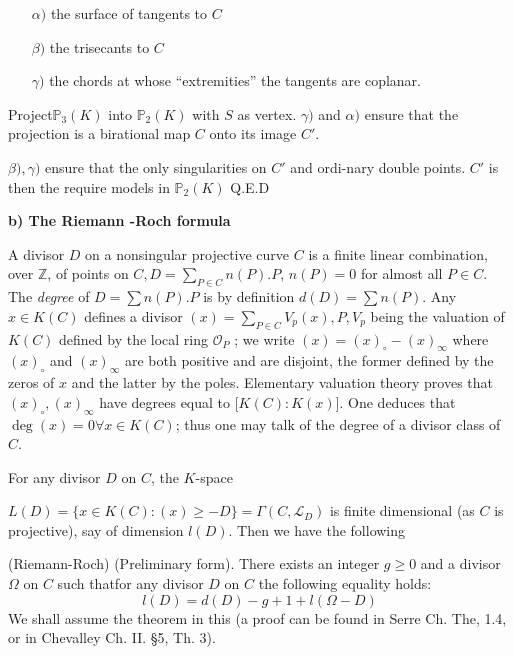 \begin{enumerate} 
\item [$\alpha)$] the surface of tangents to $C$
  
\item [$\beta)$] the trisecants to $C$
  
\item[$\gamma)$] the chords at whose ``extremities'' the tangents are
  coplanar. 
\end{enumerate}
 
Project\pageoriginale $\mathbb{P}_3(K)$ into   $\mathbb{P}_2(K)$ with $S$ as
vertex. $\gamma)$ and $\alpha)$ ensure that the projection is a
birational  map  $C$ onto its image $C'$. 

$\beta), \gamma)$ ensure that the
only singularities on $C'$ and ordi-nary double points. $C'$ is then
the require models in $\mathbb{P}_2 (K)$ \hfill {Q.E.D}

\textbf{b) The Riemann -Roch formula}
\medskip

A divisor $D$ on a nonsingular projective curve $C$ is a finite linear
combination, over  $\mathbb{Z}$, of points on $C, D  = \sum \limits _
{P \in   C}  n(P). P$, 
$n(P)=0$ for almost all $P \in C$. The \textit{degree} of $D= \sum
n(P).P$ is by definition $d (D)= \sum n(P)$. Any $x \in K (C)$ defines
a divisor $(x)=\sum \limits_{P  \in C} V_p (x), P, V_p$ being the
valuation of $K (C)$ defined by the local ring  $\mathscr{O}_P$ ; we
write $(x)=  (x)_\circ- (x)_\infty$  where  $(x)_\circ $ and
$(x)_\infty$ are both positive and are disjoint, the former defined by
the zeros of $x$ and  the latter by the poles. Elementary valuation
theory proves that $(x)_\circ, (x)_\infty$ have degrees equal to
$\big[K(C):K(x)\big]$. One deduces that $\deg (x)=0  \forall x  \in
K(C)$; thus one may talk of the degree of a  divisor class of $C$. 
 
For any divisor $D$ on $C$, the $K$-space
 
\noindent
$L(D)=\{x  \in   K(C): (x)\geq - D \}= \Gamma ( C, \mathscr{L}_D)$ is
finite dimensional (as $C$ is projective), say of dimension $l
(D)$. Then we have the following 

\setcounter{theorem}{0}
\begin{theorem}\label{chap2:sec1:thm1roch}{\rm (Riemann-Roch) (Preliminary form). }%
  There exists an integer $g \geq 0$ and a divisor $\Omega$ on $C$
  such that\pageoriginale for any divisor $D$ on $C$ the following equality holds: 
  $$
  {l (D) = d (D)-g+1+l (\Omega- D)}
  $$
  We shall assume the theorem in this (a proof can be found in Serre
  \cite{7} Ch. The, 1.4, or in Chevalley \cite{1} Ch. II. \S 5,
  Th. 3). 
\end{theorem}


